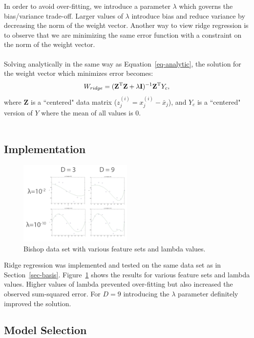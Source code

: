 \documentclass[10pt]{article}   %
\theoremstyle{plain}
\begin{document}
In order to avoid over-fitting, we introduce a parameter $\lambda$ which governs the bias/variance trade-off. Larger values of $\lambda$ introduce bias and reduce variance by decreasing the norm of the weight vector. Another way to view ridge regression is to observe that we are minimizing the same error function with a constraint on the norm of the weight vector. \\
\\
\indent Solving analytically in the same way as Equation~\ref{eq-analytic}, the solution for the weight vector which minimizes error becomes:
\begin{equation}
W_{ridge} = (\textbf{Z}^\textnormal{T}\textbf{Z}+\lambda \textbf{I})^{-1} \textbf{Z}^\textnormal{T} Y_c,
\end{equation}
where $\textbf{Z}$ is a ``centered" data matrix ($z_j^{(i)} = x_j^{(i)} - \bar{x}_j$), and $Y_c$ is a ``centered" version of $Y$ where the mean of all values is 0. \\
\\
\indent

\subsection{Implementation}

\begin{figure}[h!]\label{fig-ridge-bishop}
  \caption{Bishop data set with various feature sets and lambda values.}
  \centering
    \includegraphics[width=0.5\textwidth]{figures/problem_2_3_bishop.png}
\end{figure}

Ridge regression was implemented and tested on the same data set as in Section~\ref{sec-basis}. Figure~\ref{fig-ridge-bishop} shows the results for various feature sets and lambda values. Higher values of lambda prevented over-fitting but also increased the observed sum-squared error. For $D = 9$ introducing the $\lambda$ parameter definitely improved the solution.

\subsection{Model Selection}
\end{document}
